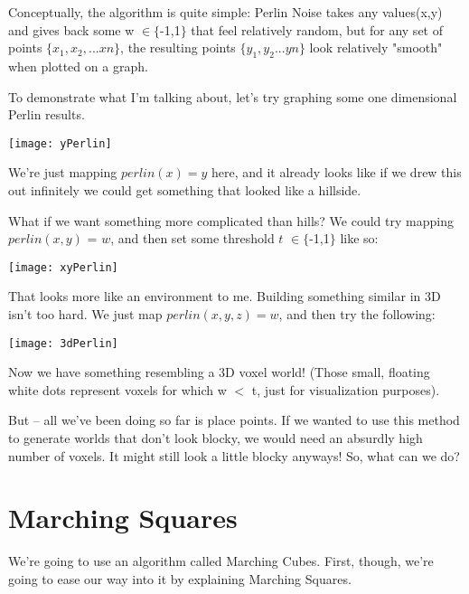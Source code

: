 \documentclass[12pt,twoside]{reedthesis}
\begin{document}
Conceptually, the algorithm is quite simple: Perlin Noise takes any values(x,y) and gives back some w $\in \{$-1,1$\}$ that feel relatively random, but for any set of points $\{x_1, x_2, ... xn\}$, the resulting points $\{y_1, y_2... yn\}$ look relatively "smooth" when plotted on a graph.

To demonstrate what I'm talking about, let's try graphing some one dimensional Perlin results.

\texttt{[image: yPerlin]}

We're just mapping $perlin(x) = y$ here, and it already looks like if we drew this out infinitely we could get something that looked like a hillside.

What if we want something more complicated than hills?
We could try mapping $perlin(x,y)$ = $w$, and then set some threshold $t$ $\in \{$-1,1$\}$ like so:

\begin{algorithm}
\end{algorithm}

\texttt{[image: xyPerlin]}

That looks more like an environment to me.
Building something similar in 3D isn't too hard.
We just map $perlin(x,y,z) = w$, and then try the following:
\begin{algorithm}
\end{algorithm}

\texttt{[image: 3dPerlin]}

Now we have something resembling a 3D voxel world! (Those small, floating white dots represent voxels for which w $<$ t, just for visualization purposes).

But -- all we've been doing so far is place points.
If we wanted to use this method to generate worlds that don't look blocky, we would need an absurdly high number of voxels.
It might still look a little blocky anyways!
So, what can we do?

\section{Marching Squares}
We're going to use an algorithm called Marching Cubes. First, though, we're going to ease our way into it by explaining Marching Squares.
\end{document}
